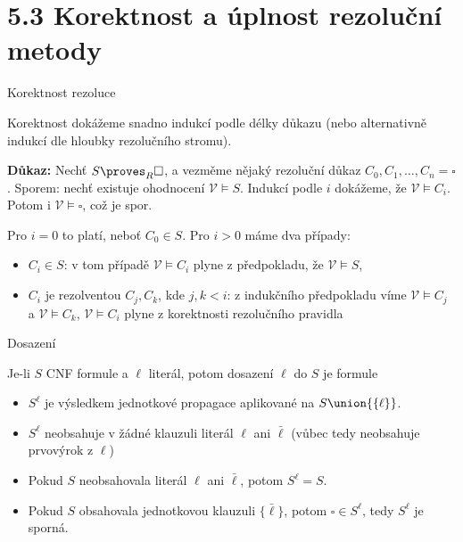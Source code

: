 \documentclass{beamer}
\begin{document}
\section{5.3 Korektnost a úplnost rezoluční metody}


\begin{frame}{Korektnost rezoluce}
    
    Korektnost dokážeme snadno indukcí podle délky důkazu (nebo alternativně indukcí dle hloubky rezolučního stromu).\pause


    \textbf{Důkaz:} Nechť $S\proves_R\square$, a vezměme nějaký rezoluční důkaz $C_0,C_1,\dots,C_n=\square$. \pause \alert{Sporem:} nechť existuje ohodnocení $\mathcal V\models S$. \pause Indukcí podle $i$ dokážeme, že \alert{$\mathcal V\models C_i$}. Potom i $\mathcal V\models \square$, což je spor. \pause
    
    Pro $i=0$ to platí, neboť $C_0\in S$. Pro $i>0$ máme dva případy:\pause
    \begin{itemize}
        \item \alert{$C_i\in S$:} v tom případě $\mathcal V\models C_i$ plyne z předpokladu, že $\mathcal V\models S$,\pause
        \item \alert{$C_i$ je rezolventou $C_j,C_k$, kde $j,k<i$:} z indukčního předpokladu víme $\mathcal V\models C_j$ a $\mathcal V\models C_k$, $\mathcal V\models C_i$ plyne z korektnosti rezolučního pravidla\hfill\qedsymbol
    \end{itemize}

\end{frame}


\begin{frame}{Dosazení}

    
    Je-li $S$ CNF formule a $\ell$ literál, potom \alert{dosazení} $\ell$ do $S$ je formule
    \pause
        
    \begin{itemize}
        \item $S^\ell$ je výsledkem \alert{jednotkové propagace} aplikované na $S\union\{\{\ell\}\}$.\pause
        \item $S^\ell$ neobsahuje v žádné klauzuli literál $\ell$ ani $\bar\ell$ (vůbec tedy neobsahuje prvovýrok z $\ell$)\pause
        \item Pokud $S$ neobsahovala literál $\ell$ ani $\bar\ell$, potom $S^\ell=S$.\pause
        \item Pokud $S$ obsahovala jednotkovou klauzuli $\{\bar\ell\}$, potom $\square\in S^\ell$, tedy $S^\ell$ je sporná.
    \end{itemize} 

\end{frame}
\end{document}
